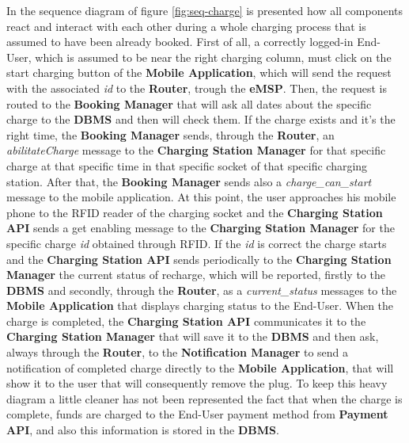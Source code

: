 \documentclass[a4paper]{report}
\begin{document}
In the sequence diagram of figure \ref{fig:seq-charge} is presented how all components react and interact with each other during a whole charging process that is assumed to have been already booked. First of all, a correctly logged-in End-User, which is assumed to be near the right charging column, must click on the start charging button of the \textbf{Mobile Application}, which will send the request with the associated \textit{id} to the \textbf{Router}, trough the \textbf{eMSP}. Then, the request is routed to the \textbf{Booking Manager} that will ask all dates about the specific charge to the \textbf{DBMS} and then will check them. If the charge exists and it's the right time, the \textbf{Booking Manager} sends, through the \textbf{Router}, an \textit{abilitateCharge} message to the \textbf{Charging Station Manager} for that specific charge at that specific time in that specific socket of that specific charging station. After that, the \textbf{Booking Manager} sends also a \textit{charge\_can\_start} message to the mobile application. At this point, the user approaches his mobile phone to the RFID reader of the charging socket and the \textbf{Charging Station API} sends a get enabling message to the \textbf{Charging Station Manager} for the specific charge \textit{id} obtained through RFID. If the \textit{id} is correct the charge starts and the \textbf{Charging Station API} sends periodically to the \textbf{Charging Station Manager} the current status of recharge, which will be reported, firstly to the \textbf{DBMS} and secondly, through the \textbf{Router}, as a \textit{current\_status} messages to the \textbf{Mobile Application} that displays charging status to the End-User. When the charge is completed, the \textbf{Charging Station API} communicates it to the \textbf{Charging Station Manager} that will save it to the \textbf{DBMS} and then ask, always through the \textbf{Router}, to the \textbf{Notification Manager} to send a notification of completed charge directly to the \textbf{Mobile Application}, that will show it to the user that will consequently remove the plug. To keep this heavy diagram a little cleaner has not been represented the fact that when the charge is complete, funds are charged to the End-User payment method from \textbf{Payment API}, and also this information is stored in the \textbf{DBMS}.
\\\\
\end{document}
